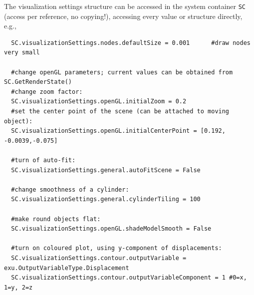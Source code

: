 The visualization settings structure can be accessed in the system container \texttt{SC} (access per reference, no copying!), accessing every value or structure directly, e.g.,
\pythonstyle\begin{lstlisting}
  SC.visualizationSettings.nodes.defaultSize = 0.001      #draw nodes very small

  #change openGL parameters; current values can be obtained from SC.GetRenderState()
  #change zoom factor:
  SC.visualizationSettings.openGL.initialZoom = 0.2       
  #set the center point of the scene (can be attached to moving object):
  SC.visualizationSettings.openGL.initialCenterPoint = [0.192, -0.0039,-0.075]

  #turn of auto-fit:
  SC.visualizationSettings.general.autoFitScene = False

  #change smoothness of a cylinder:
  SC.visualizationSettings.general.cylinderTiling = 100
  
  #make round objects flat:
  SC.visualizationSettings.openGL.shadeModelSmooth = False

  #turn on coloured plot, using y-component of displacements:
  SC.visualizationSettings.contour.outputVariable = exu.OutputVariableType.Displacement
  SC.visualizationSettings.contour.outputVariableComponent = 1 #0=x, 1=y, 2=z
\end{lstlisting}

